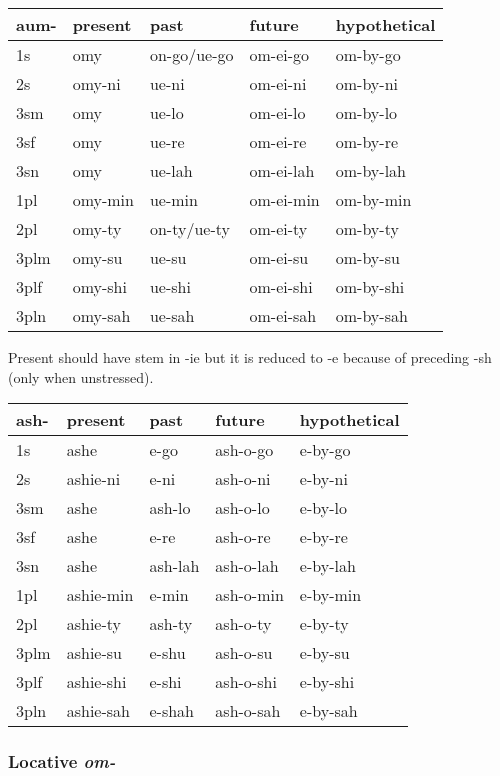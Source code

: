 \documentclass[
  a4paper,
]{article}
\begin{document}
\begin{longtable}[]{@{}lllll@{}}
\toprule
aum- & present & past & future & hypothetical \\
\midrule
\endhead
1s & omy & on-go/ue-go & om-ei-go & om-by-go \\
2s & omy-ni & ue-ni & om-ei-ni & om-by-ni \\
3sm & omy & ue-lo & om-ei-lo & om-by-lo \\
3sf & omy & ue-re & om-ei-re & om-by-re \\
3sn & omy & ue-lah & om-ei-lah & om-by-lah \\
1pl & omy-min & ue-min & om-ei-min & om-by-min \\
2pl & omy-ty & on-ty/ue-ty & om-ei-ty & om-by-ty \\
3plm & omy-su & ue-su & om-ei-su & om-by-su \\
3plf & omy-shi & ue-shi & om-ei-shi & om-by-shi \\
3pln & omy-sah & ue-sah & om-ei-sah & om-by-sah \\
\bottomrule
\end{longtable}

Present should have stem in -ie but it is reduced to -e because of
preceding -sh (only when unstressed).

\begin{longtable}[]{@{}lllll@{}}
\toprule
ash- & present & past & future & hypothetical \\
\midrule
\endhead
1s & ashe & e-go & ash-o-go & e-by-go \\
2s & ashie-ni & e-ni & ash-o-ni & e-by-ni \\
3sm & ashe & ash-lo & ash-o-lo & e-by-lo \\
3sf & ashe & e-re & ash-o-re & e-by-re \\
3sn & ashe & ash-lah & ash-o-lah & e-by-lah \\
1pl & ashie-min & e-min & ash-o-min & e-by-min \\
2pl & ashie-ty & ash-ty & ash-o-ty & e-by-ty \\
3plm & ashie-su & e-shu & ash-o-su & e-by-su \\
3plf & ashie-shi & e-shi & ash-o-shi & e-by-shi \\
3pln & ashie-sah & e-shah & ash-o-sah & e-by-sah \\
\bottomrule
\end{longtable}

\hypertarget{locative-om-}{%
\subsubsection{\texorpdfstring{Locative
\emph{om-}}{Locative om-}}\label{locative-om-}}
\end{document}
